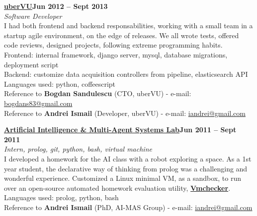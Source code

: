 \documentclass[margin,line]{resume}
\begin{document}
\begin{resume}
	\vspace{1.2mm}\href{http://www.ubervu.com}{\textbf{uberVU}}\hfill \textbf{Jun 2012 -- Sept 2013}\vspace{1.2mm}\\
	\vspace{1mm} \textsl{Software Developer}\vspace{1.5mm}\\
	I had both frontend and backend responsabilities, working with a small team in a startup agile environment, on the edge of releases. We all wrote tests, offered code reviews, designed projects, following extreme programming habits.\vspace{1.2mm}\\
	Frontend: internal framework, django server, mysql, database migrations, deployment script\vspace{1.2mm}\\
	Backend: customize data acquisition controllers from pipeline, elasticsearch API\vspace{1.2mm}\\
	Languages used: python, coffeescript\vspace{1.2mm}\\
	\small{Reference to \textbf{Bogdan Sandulescu} (CTO, uberVU) - e-mail: \href{mailto:bogdans83@gmail.com}{bogdans83@gmail.com}}\\
	\small{Reference to \textbf{Andrei Ismail} (Developer, uberVU) - e-mail: \href{mailto:iandrei@gmail.com}{iandrei@gmail.com}}

	\vspace{1.2mm}\href{http://aimas.cs.pub.ro/}{\textbf{Artificial Intelligence \& Multi-Agent Systems Lab}}\hfill \textbf{Jun 2011 -- Sept 2011}\vspace{1.2mm}\\
	\vspace{1mm} \textsl{Intern, prolog, git, python, bash, virtual machine}\vspace{1.5mm}\\
	I developed a homework for the AI class with a robot exploring a space. As a 1st year student, the declarative way of thinking from prolog was a challenging and wonderful experience. Customized a Linux minimal VM, as a sandbox, to run over an open-source automated homework evaluation utility, \href{https://elf.cs.pub.ro/vmchecker/ui/?locale=en}{\textbf{Vmchecker}}.\vspace{1.2mm}\\
	Languages used: prolog, python, bash\vspace{1.2mm}\\
	\small{Reference to \textbf{Andrei Ismail} (PhD, AI-MAS Group) - e-mail: \href{mailto:iandrei@gmail.com}{iandrei@gmail.com}}


\end{resume}
\end{document}
